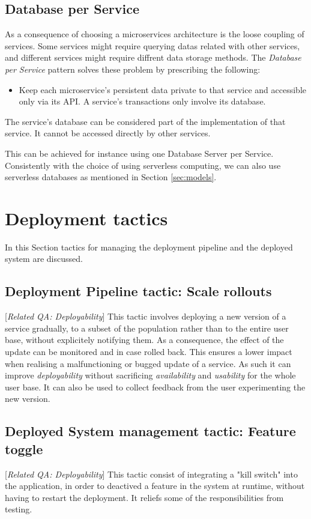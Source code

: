 \documentclass{article}
\begin{document}
\subsection{Database per Service}
As a consequence of choosing a microservices architecture is the loose coupling of services. Some services might require querying datas related with other services, and different services might require diffrent data storage methods.
The \textit{Database per Service} pattern solves these problem by prescribing the following:
\begin{itemize}
\item Keep each microservice's persistent data private to that service and accessible only via its API. A service's transactions only involve its database.
\end{itemize}

The service's database can be considered part of the implementation of that service. It cannot be accessed directly by other services.

This can be achieved for instance using one Database Server per Service.
Consistently with the choice of using serverless computing, we can also use serverless databases as mentioned in Section \ref{sec:models}.

\section{Deployment tactics}

In this Section tactics for managing the deployment pipeline and the deployed system are discussed.

\subsection{Deployment Pipeline tactic: Scale rollouts}[\textit{Related QA:  Deployability}]
This tactic involves deploying a new version of a service gradually, to a subset of the population rather than to the entire user base, without explicitely notifying them. As a consequence, the effect of the update can be monitored and in case rolled back. This ensures a lower impact when realising a malfunctioning or bugged update of a service. As such it can improve \textit{deployability} without sacrificing \textit{availability} and \textit{usability} for the whole user base.
It can also be used to collect feedback from the user experimenting the new version.

\subsection{Deployed System management tactic: Feature toggle}[\textit{Related QA: Deployability}]
This tactic consist of integrating a "kill switch" into the application, in order to deactived a feature in the system at runtime, without having to restart the deployment. It reliefs some of the responsibilities from testing.
\end{document}
